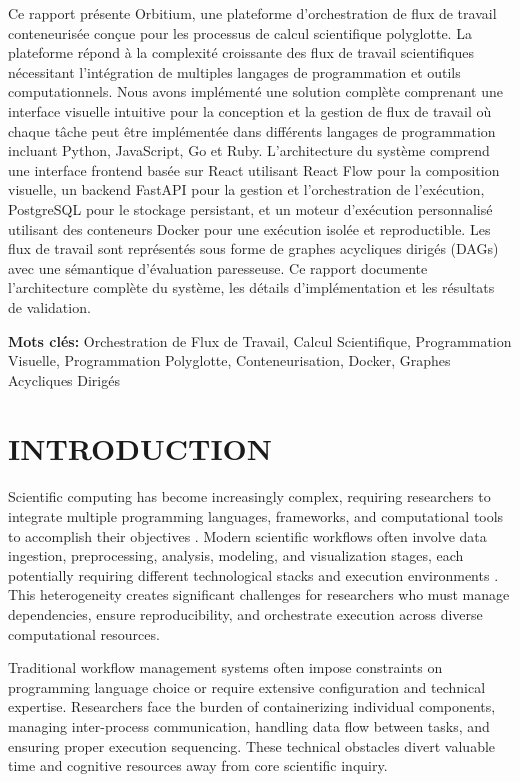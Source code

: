 \documentclass[12pt]{article}
\begin{document}
Ce rapport présente Orbitium, une plateforme d'orchestration de flux de travail conteneurisée conçue pour les processus de calcul scientifique polyglotte. La plateforme répond à la complexité croissante des flux de travail scientifiques nécessitant l'intégration de multiples langages de programmation et outils computationnels. Nous avons implémenté une solution complète comprenant une interface visuelle intuitive pour la conception et la gestion de flux de travail où chaque tâche peut être implémentée dans différents langages de programmation incluant Python, JavaScript, Go et Ruby. L'architecture du système comprend une interface frontend basée sur React utilisant React Flow pour la composition visuelle, un backend FastAPI pour la gestion et l'orchestration de l'exécution, PostgreSQL pour le stockage persistant, et un moteur d'exécution personnalisé utilisant des conteneurs Docker pour une exécution isolée et reproductible. Les flux de travail sont représentés sous forme de graphes acycliques dirigés (DAGs) avec une sémantique d'évaluation paresseuse. Ce rapport documente l'architecture complète du système, les détails d'implémentation et les résultats de validation.

\vspace{1cm}

\noindent
\textbf{Mots clés:} Orchestration de Flux de Travail, Calcul Scientifique, Programmation Visuelle, Programmation Polyglotte, Conteneurisation, Docker, Graphes Acycliques Dirigés

\newpage
\section{INTRODUCTION}

Scientific computing has become increasingly complex, requiring researchers to integrate multiple programming languages, frameworks, and computational tools to accomplish their objectives \cite{cohen2020scientific}. Modern scientific workflows often involve data ingestion, preprocessing, analysis, modeling, and visualization stages, each potentially requiring different technological stacks and execution environments \cite{deelman2015future}. This heterogeneity creates significant challenges for researchers who must manage dependencies, ensure reproducibility, and orchestrate execution across diverse computational resources.

Traditional workflow management systems often impose constraints on programming language choice or require extensive configuration and technical expertise. Researchers face the burden of containerizing individual components, managing inter-process communication, handling data flow between tasks, and ensuring proper execution sequencing. These technical obstacles divert valuable time and cognitive resources away from core scientific inquiry.
\end{document}

